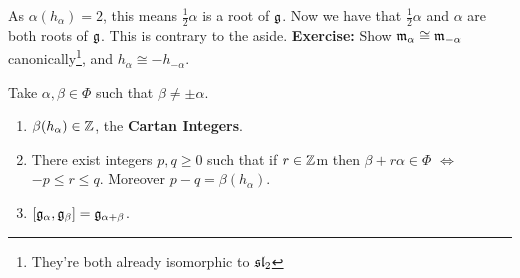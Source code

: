 \documentclass{article}
\begin{document}
As $\alpha(h_{\alpha})=2$, this means $\frac{1}{2}\alpha$ is a root of $\mathfrak{g}$. Now we have that $\frac{1}{2}\alpha$ and $\alpha$ are both roots of $\mathfrak{g}$. This is contrary to the aside.
\endproof
\textbf{Exercise: } Show $\mathfrak{m}_{\alpha} \cong \mathfrak{m}_{-\alpha}$ canonically\footnote{They're both already isomorphic to $\mathfrak{sl}_{2}$}, and $h_{\alpha} \cong -h_{-\alpha}$.
\begin{fancyprop}{}
    Take $\alpha, \beta \in \Phi$ such that $\beta \neq \pm \alpha$. \begin{enumerate}
        \item $\beta(h_{\alpha}) \in \mathbb{Z}$, the \textbf{Cartan Integers}.
        \item There exist integers $p,q \geq 0$ such that if $r \in \mathbb{Z}$m then $\beta + r \alpha \in \Phi$ $\Leftrightarrow$ $-p \leq r \leq q$. Moreover $p-q = \beta(h_{\alpha})$.
        \item $[\mathfrak{g}_{\alpha},\mathfrak{g}_{\beta}]=\mathfrak{g}_{\alpha+\beta}$.
    \end{enumerate}
\end{fancyprop}
\proof \hspace{0.1cm}
\end{document}
